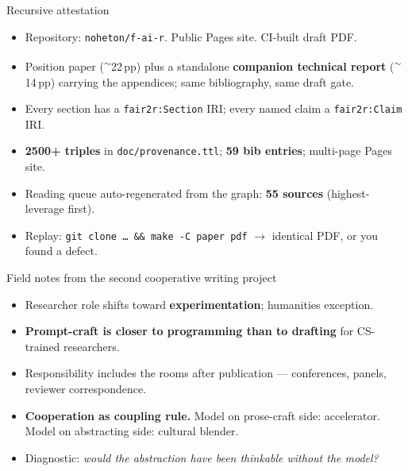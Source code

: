 \documentclass[aspectratio=169,11pt]{beamer}
\begin{document}
\begin{frame}{Recursive attestation}
  \begin{itemize}
    \item Repository: \texttt{noheton/f-ai-r}. Public Pages site. CI-built draft PDF.
    \item Position paper (\textsuperscript{$\sim$}22\,pp) plus a standalone
          \textbf{companion technical report} (\textsuperscript{$\sim$}14\,pp)
          carrying the appendices; same bibliography, same draft gate.
    \item Every section has a \texttt{fair2r:Section} IRI; every named claim a \texttt{fair2r:Claim} IRI.
    \item \textbf{2500+ triples} in \texttt{doc/provenance.ttl}; \textbf{59 bib entries}; multi-page Pages site.
    \item Reading queue auto-regenerated from the graph: \textbf{55 sources} (highest-leverage first).
    \item Replay: \texttt{git clone \dots\ \&\&\ make -C paper pdf} $\to$ identical PDF, or you found a defect.
  \end{itemize}
\end{frame}

\begin{frame}{Field notes from the second cooperative writing project}
  \begin{itemize}
    \item Researcher role shifts toward \textbf{experimentation}; humanities exception.
    \item \textbf{Prompt-craft is closer to programming than to drafting} for CS-trained researchers.
    \item Responsibility includes the rooms after publication --- conferences, panels, reviewer correspondence.
    \item \textbf{Cooperation as coupling rule.} Model on prose-craft side: accelerator. Model on abstracting side: cultural blender.
    \item Diagnostic: \emph{would the abstraction have been thinkable without the model?}
  \end{itemize}
\end{frame}

\end{document}
